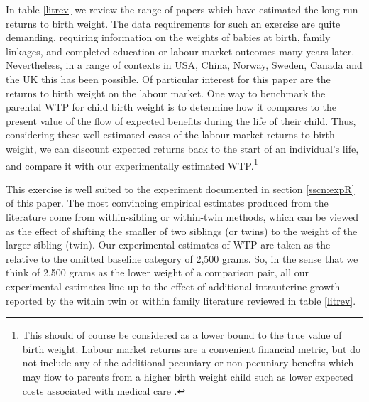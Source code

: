 \documentclass[a4paper, 11pt]{article}
\begin{document}
\begin{spacing}{1.4}
In table \ref{litrev} we review the range of papers which have estimated
the long-run returns to birth weight.  The data requirements for such an
exercise are quite demanding, requiring information on the weights of
babies at birth, family linkages, and completed education or labour market
outcomes many years later.  Nevertheless, in a range of contexts in USA,
China, Norway, Sweden, Canada and the UK this has been possible.  Of
particular interest for this paper are the returns to birth weight on
the labour market.  One way to benchmark the parental WTP for child
birth weight is to determine how it compares to the present value of the
flow of expected benefits during the life of their child. Thus,
considering these well-estimated cases of the labour market returns to
birth weight, we can discount expected returns back to the start of an
individual's life, and compare it with our experimentally estimated
WTP.\footnote{This should of course be considered as a lower bound to
  the true value of birth weight.  Labour market returns are a convenient
  financial metric, but do not include any of the additional pecuniary or
  non-pecuniary benefits which may flow to parents from a higher birth weight
  child such as lower expected costs associated with medical care
  \citep{Almondetal2005}.}


This exercise is well suited to the experiment documented in section
\ref{sscn:expR} of this paper.  The most convincing empirical estimates
produced from the literature come from within-sibling or within-twin
methods, which can be viewed as the effect of shifting the smaller of
two siblings (or twins) to the weight of the larger sibling (twin).
Our experimental estimates of WTP are taken as the relative to the
omitted baseline category of 2,500 grams.  So, in the sense that we
think of 2,500 grams as the lower weight of a comparison pair, all
our experimental estimates line up to the effect of additional
intrauterine growth reported by the within twin or within family
literature reviewed in table \ref{litrev}.


\end{spacing}
\end{document}
